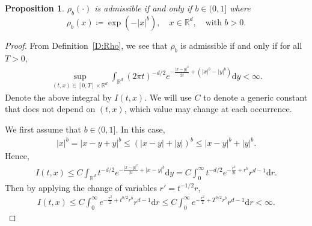\documentclass[sn-mathphys]{sn-jnl}%
\newcommand{\BR}{\mathbb{R}}
\newcommand{\ud}{\ensuremath{\mathrm{d}}}
\numberwithin{equation}{section}
\theoremstyle{thmstyleone}%
\newtheorem{proposition}[theorem]{Proposition}%
\theoremstyle{thmstyletwo}%
\theoremstyle{thmstylethree}%
\begin{document}
\begin{proposition}\label{P:adm}
  $\rho_b(\cdot)$ is admissible if and only if $b\in (0,1]$ where
	\begin{equation*}
	\rho_b(x) \coloneqq \exp\left(-\lvert x \rvert^b\right), \quad x\in\BR^d,
	\quad \text{with $b>0$.}
	\end{equation*}
\end{proposition}
\begin{proof}
  From Definition~\ref{D:Rho}, we see that $\rho_b$ is admissible if and only if for all $T>0$,
	\begin{align*}
	\sup_{(t,x)\in[0,T]\times\BR^d} \int_{\BR^d} \left(2\pi t\right)^{-d/2} e^{-\frac{\lvert x-y \rvert^2}{2t} + (\lvert x \rvert^b - \lvert y \rvert^b)} \ud y <\infty.
	\end{align*}
  Denote the above integral by $I(t,x)$. We will use $C$ to denote a generic constant that does not
  depend on $(t,x)$, which value may change at each occurrence.

	We first assume that $b\in (0,1]$. In this case,
	\begin{align*}
    \lvert  x  \rvert ^b
    = \lvert  x-y +y  \rvert ^b
    \le \left(\lvert x-y \rvert + \lvert y \rvert\right)^b
    \le \lvert x-y \rvert^b + \lvert y \rvert^b.
	\end{align*}
	Hence,
	\begin{align*}
    I(t,x) \le C \int_{\BR^d} t^{-d/2} e^{-\frac{\lvert x-y \rvert^2}{2t} + \lvert x-y \rvert^b} \ud y
    = C \int_{0}^\infty t^{-d/2} e^{-\frac{r^2}{2t} + r^b} r^{d-1} \ud r.
	\end{align*}
	Then by applying the change of variables $r' = t^{-1/2}r$,
	\begin{align*}
    I(t,x) \le C \int_0^\infty e^{-\frac{r^2}{2} + t^{b/2} r^b} r^{d-1}\ud r
    \le C \int_0^\infty e^{-\frac{r^2}{2} + T^{b/2} r^b} r^{d-1}\ud r
    < \infty.
	\end{align*}


\end{proof}
\end{document}
